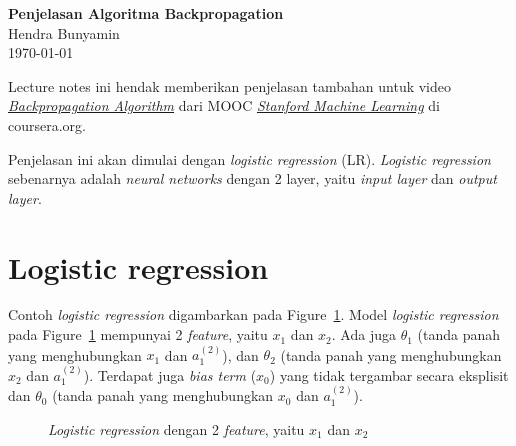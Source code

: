 \documentclass[12pt]{article}
\begin{document}
\begin{center}
  \Large \textbf{Penjelasan Algoritma Backpropagation} \\
  \vspace{0.1in}
  \normalsize Hendra Bunyamin \\
  \today
\end{center}

Lecture notes ini hendak memberikan penjelasan tambahan untuk video \href{https://www.coursera.org/lecture/machine-learning/backpropagation-algorithm-1z9WW}{\textit{Backpropagation Algorithm}} dari MOOC \href{https://www.coursera.org/learn/machine-learning/home/welcome}{\textit{Stanford Machine Learning}} di coursera.org. 

Penjelasan ini akan dimulai dengan \textit{logistic regression} (LR). \textit{Logistic regression} sebenarnya adalah \textit{neural networks} dengan 2 layer, yaitu \textit{input layer} dan \textit{output layer}. 

\section*{Logistic regression}
Contoh \textit{logistic regression} digambarkan pada Figure~\ref{fig:LR}. Model \textit{logistic regression} pada Figure~\ref{fig:LR} mempunyai 2 \textit{feature}, yaitu $x_1$ dan $x_2$. Ada juga $\theta_1$ (tanda panah yang menghubungkan $x_1$ dan $a^{(2)}_1$), dan $\theta_2$ (tanda panah yang menghubungkan $x_2$ dan $a^{(2)}_1$). Terdapat juga \textit{bias term} ($x_0$) yang tidak tergambar secara eksplisit dan $\theta_0$ (tanda panah yang menghubungkan $x_0$ dan $a^{(2)}_1$).

\def\layersep{2.5cm}
\begin{figure}[!ht]
	\centering
{}	
\caption{\textit{Logistic regression} dengan 2 \textit{feature}, yaitu $x_1$ dan $x_2$}
\label{fig:LR}
\end{figure}
\end{document}
